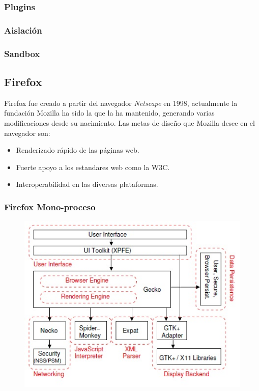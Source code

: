         \subsubsection{Plugins}

        \subsubsection{Aislación}

        \subsubsection{Sandbox}

    \subsection{Firefox}
    \label{chap3:Firefox}

    Firefox fue creado a partir del navegador \textit{Netscape} en 1998, actualmente la fundación Mozilla ha sido la que la ha mantenido, generando varias modificaciones desde su nacimiento. Las metas de diseño que Mozilla desee en el navegador son:
    \begin{itemize}
        \item Renderizado rápido de las páginas web.
        \item Fuerte apoyo a los estandares web como la W3C.
        \item Interoperabilidad en las diversas plataformas.
    \end{itemize}

    \subsubsection{Firefox Mono-proceso}
        \begin{figure}[h!t]
    		\centering
        	\includegraphics[scale=0.8]{figures/archMoz.jpg}
            \label{fig:archM}
        \end{figure}
                
